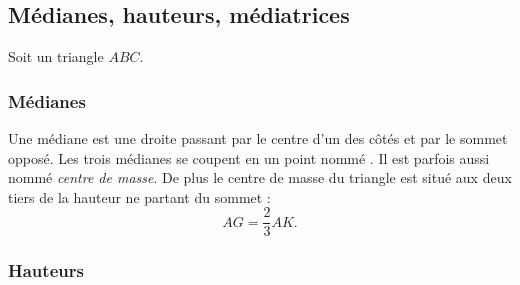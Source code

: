 
\subsection{Médianes, hauteurs, médiatrices}

Soit un triangle \( ABC\).

\subsubsection{Médianes}

\begin{multicols}{2}
    Une médiane est une droite passant par le centre d'un des côtés et par le sommet opposé. Les trois médianes se coupent en un point nommé . Il est parfois aussi nommé \emph{centre de masse}. De plus le centre de masse du triangle est situé aux deux tiers de la hauteur ne partant du sommet :
    \begin{equation}
        AG=\frac{ 2 }{ 3 }AK.
    \end{equation}

    \columnbreak


    \begin{center}

    \end{center}

\end{multicols}

\subsubsection{Hauteurs}

